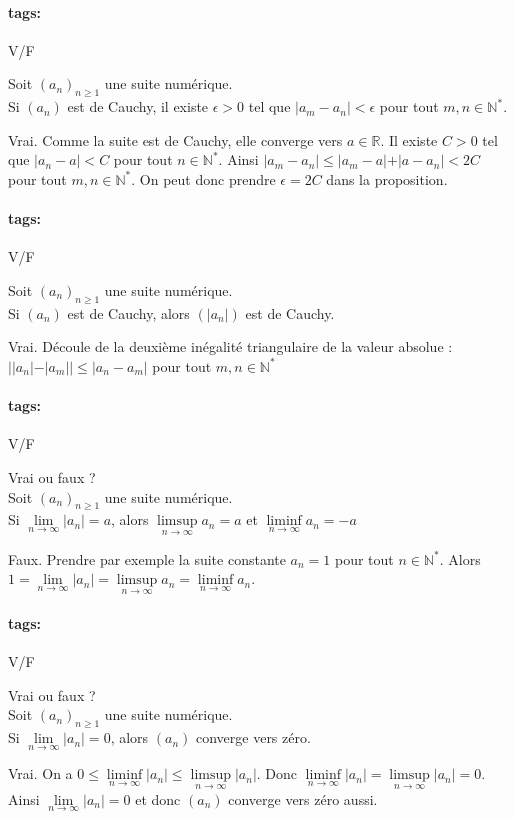 \documentclass[12pt]{article}
\newcommand*{\xfield}[1]{\begin{mdframed}\centering #1\end{mdframed}\bigskip}
\newenvironment{note}{}{}
\newcommand*{\tags}[1]{\paragraph{tags: }#1}
\begin{document}
\begin{note}
\tags{V/F}
	\xfield{Soit $(a_n)_{n\ge 1}$ une suite numérique.\\
	Si $(a_n)$ est de Cauchy, il existe $\epsilon > 0$ tel que $\vert a_m - a_n \vert < \epsilon$ pour tout $m,n \in \mathbb{N}^*$.}
	\xfield{Vrai. Comme la suite est de Cauchy, elle converge vers $a \in \mathbb{R}$. Il existe $C>0$ tel que $\vert a_n - a \vert < C$ pour tout $n \in \mathbb{N}^*$. Ainsi $\vert a_m - a_n \vert \le \vert a_m - a \vert + \vert a - a_n \vert < 2C$ pour tout $m,n \in \mathbb{N}^*$. On peut donc prendre $\epsilon = 2C$ dans la proposition.}
\end{note}

\begin{note}
\tags{V/F}
	\xfield{Soit $(a_n)_{n\ge 1}$ une suite numérique.\\
	Si $(a_n)$ est de Cauchy, alors $(\vert a_n \vert)$ est de Cauchy. }
	\xfield{Vrai. Découle de la deuxième inégalité triangulaire de la valeur absolue : $\big|\vert a_n \vert - \vert a_m\vert\big| \le \vert a_n - a_m \vert$ pour tout $m,n \in \mathbb{N}^*$}
\end{note}

\begin{note}
\tags{V/F}
	\xfield{Vrai ou faux ?\\
	Soit $(a_n)_{n\ge 1}$ une suite numérique.\\
	Si $\lim\limits_{n \to \infty} \vert a_n \vert = a$, alors $\limsup\limits_{n \to \infty}a_n = a$ et $\liminf\limits_{n \to \infty}a_n = -a$}
	\xfield{Faux. Prendre par exemple la suite constante $a_n = 1$ pour tout $n \in \mathbb{N}^*$. Alors $1= \lim\limits_{n \to \infty} \vert a_n \vert = \limsup\limits_{n \to \infty} a_n = \liminf\limits_{n \to \infty} a_n$.}
\end{note}

\begin{note}
\tags{V/F}
	\xfield{Vrai ou faux ?\\
	Soit $(a_n)_{n\ge 1}$ une suite numérique.\\
	Si $\lim\limits_{n \to \infty} \vert a_n \vert = 0$, alors $(a_n)$ converge vers zéro.}
	\xfield{Vrai. On a $0 \le \liminf\limits_{n \to \infty} \vert a_n \vert \le \limsup\limits_{n \to \infty} \vert a_n \vert$. Donc $\liminf\limits_{n \to \infty} \vert a_n \vert = \limsup\limits_{n \to \infty} \vert a_n \vert = 0$. Ainsi $\lim\limits_{n \to \infty} \vert a_n \vert =0$ et donc $(a_n)$ converge vers zéro aussi.}
\end{note}
\end{document}
